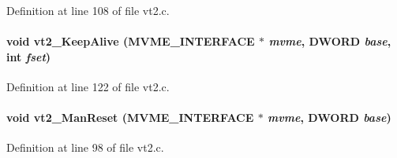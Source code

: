 Definition at line 108 of file vt2.c.
\paragraph[{vt2\_\-KeepAlive}]{\setlength{\rightskip}{0pt plus 5cm}void vt2\_\-KeepAlive ({\bf MVME\_\-INTERFACE} $\ast$ {\em mvme}, \/  {\bf DWORD} {\em base}, \/  int {\em fset})}\hfill\label{vt2_8c_ac41935a98cc3b8218c3e8e04900589c9}


Definition at line 122 of file vt2.c.
\paragraph[{vt2\_\-ManReset}]{\setlength{\rightskip}{0pt plus 5cm}void vt2\_\-ManReset ({\bf MVME\_\-INTERFACE} $\ast$ {\em mvme}, \/  {\bf DWORD} {\em base})}\hfill\label{vt2_8c_ad04d179623a3c13ebc16c255e6301d77}


Definition at line 98 of file vt2.c.